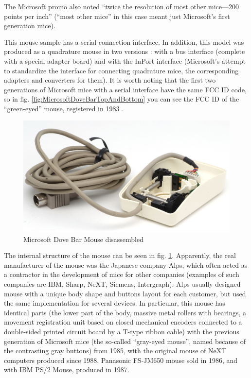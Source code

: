 \documentclass[11pt, a4paper]{article}
\begin{document}
The Microsoft promo also noted ``twice the resolution of most other mice—200 points per inch'' (``most other mice'' in this case meant just Microsoft's first generation mice).

This mouse sample has a serial connection interface. In addition, this model was produced as a quadrature mouse in two versions \cite{guide}: with a bus interface (complete with a special adapter board) and with the InPort interface (Microsoft’s attempt to standardize the interface for connecting quadrature mice, the corresponding adapters and converters for them). It is worth noting that the first two generations of Microsoft mice with a serial interface have the same FCC ID code, so in fig. \ref{fig:MicrosoftDoveBarTopAndBottom} you can see the FCC ID of the ``green-eyed'' mouse, registered in 1983 \cite{zero}. 

\begin{figure}[h]
    \centering
    \includegraphics[scale=0.5]{1987_microsoft_dove_bar_mouse/inside1_30.jpg}
    \caption{Microsoft Dove Bar Mouse disassembled}
    \label{fig:MicrosoftDoveBarInside}
\end{figure}

The internal structure of the mouse can be seen in fig. \ref{fig:MicrosoftDoveBarInside}. Apparently, the real manufacturer of the mouse was the Japanese company Alps, which often acted as a contractor in the development of mice for other companies (examples of such companies are IBM, Sharp, NeXT,  Siemens, Intergraph). Alps usually designed mouse with a unique body shape and buttons layout for each customer, but used the same implementation for several devices. In particular, this mouse has identical parts (the lower part of the body, massive metal rollers with bearings, a movement registration unit based on closed mechanical encoders connected to a double-sided printed circuit board by a T-type ribbon cable) with the previous generation of Microsoft mice (the so-called ``gray-eyed mouse'', named because of the contrasting gray buttons) from 1985, with the original mouse of NeXT computers produced since 1988, Panasonic FS-JM650 mouse sold in 1986, and with IBM PS/2 Mouse, produced in 1987.
\end{document}
